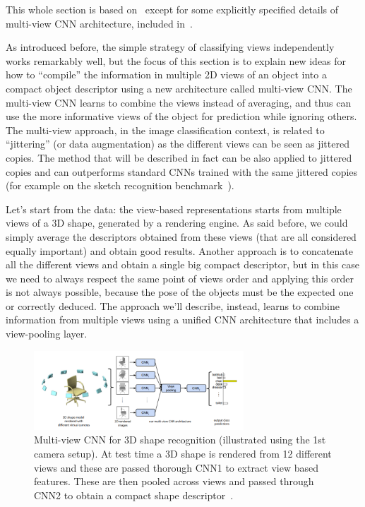 
This whole section is based on~\cite{multi_view} except for some explicitly specified details of multi-view CNN architecture, included in~\cite{LBMPFusion}.

As introduced before, the simple strategy of classifying views independently works remarkably well, but the focus of this section is to explain new ideas for how to “compile” the information in multiple 2D views of an object into a compact object descriptor using a new architecture called multi-view CNN. The multi-view CNN learns to combine the views instead of averaging, and thus can use the more informative views of the object for prediction while ignoring others. The multi-view approach, in the image classification context, is related to “jittering” (or data augmentation) as the different views can be seen as jittered copies. The method that will be described in fact can be also applied to jittered copies and can outperforms standard CNNs trained with the same jittered copies (for example on the sketch recognition benchmark~\cite{eitz2012hdhso}).

Let's start from the data: the view-based representations starts from multiple views of a 3D shape, generated by a rendering engine. As said before, we could simply average the descriptors obtained from these views (that are all considered equally important) and obtain good results. Another approach is to concatenate all the different views and obtain a single big compact descriptor, but in this case we need to always respect the same point of views order and applying this order is not always possible, because the pose of the objects must be the expected one or correctly deduced.
The approach we'll describe, instead, learns to combine information from multiple views using a unified CNN architecture that includes a view-pooling layer.
\begin{figure}[ht]
    \centering
    \captionsetup{width=.8\linewidth}
    \includegraphics[width=0.7\textwidth]{images/multiview.png}
    \caption{ Multi-view CNN for 3D shape recognition (illustrated using the 1st camera setup). At test time a 3D shape is rendered from 12
different views and these are passed thorough CNN1 to extract view based features. These are then pooled across views and passed through
CNN2 to obtain a compact shape descriptor~\cite{multi_view}.}
    \label{fig:multiview}
\end{figure}

